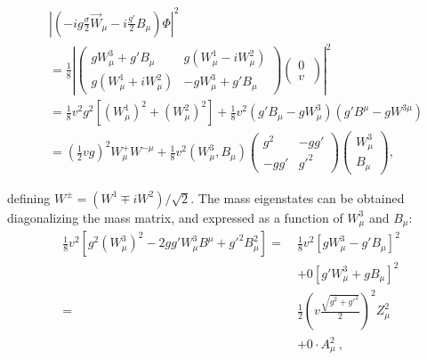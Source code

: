 \begin{equation}
  \begin{split}
    & \left|\left(-ig\frac{\sigma}{2}\vec{W}_\mu - i\frac{g'}{2}B_\mu \right)\Phi\right|^2 \\
    &= \frac{1}{8} \left|\left(
    \begin{matrix}
      gW_\mu^3 + g'B_\mu & g(W_\mu^1 - iW_\mu^2) \\
      g(W_\mu^1 + iW_\mu^2) & -gW_\mu^3 + g'B_\mu 
    \end{matrix}
    \right)
    \left(
    \begin{matrix}
      0 \\%
      v   \
    \end{matrix}
    \right) \right|^2 \\
    &= \frac{1}{8} v^2 g^2 \left[(W_\mu^1)^2 + (W_\mu^2)^2\right] + \frac{1}{8} v^2 (g'B_\mu - gW_\mu^3)(g'B^\mu - gW^{3\mu}) \\
    &= \left(\frac{1}{2}vg\right)^2 W_\mu^{+} W^{-\mu} + \frac{1}{8} v^2 \left(W_\mu^3, B_\mu\right) 
    \left(
    \begin{matrix}
      g^2 & -gg' \\
      -gg' & g'^2
    \end{matrix}
    \right)
    \left(
    \begin{matrix}
      W_\mu^3 \\
      B_\mu
    \end{matrix}
    \right),
  \end{split}
  \label{eq:HiggsBosonMassDemonstration}
\end{equation}

\noindent defining $W^{\pm} = (W^1 \mp iW^2)/\sqrt{2}$.
The mass eigenstates can be obtained diagonalizing the mass matrix, and expressed as a function of $W_\mu^3$ and $B_\mu$:
%
%
\begin{equation}
\begin{split}
    \frac{1}{8}v^2\left[g^2\left(W_\mu^3\right)^2 - 2gg'W_\mu^3 B^\mu + g'^2B_\mu^2\right] 
    =\ & \frac{1}{8}v^2\left[ gW_\mu^3 - g'B_\mu\right]^2           \\
    &+ 0 \left[g'W_\mu^3 + gB_\mu\right]^2 \\
    =\ & \frac{1}{2}\left(v\frac{\sqrt{g^2+g'^2}}2\right)^2 Z_\mu^2 \\
    &+ 0 \cdot A_\mu^2~, 
\end{split}
  \label{eq:HiggsBosonMassDemonstration2}
\end{equation}

